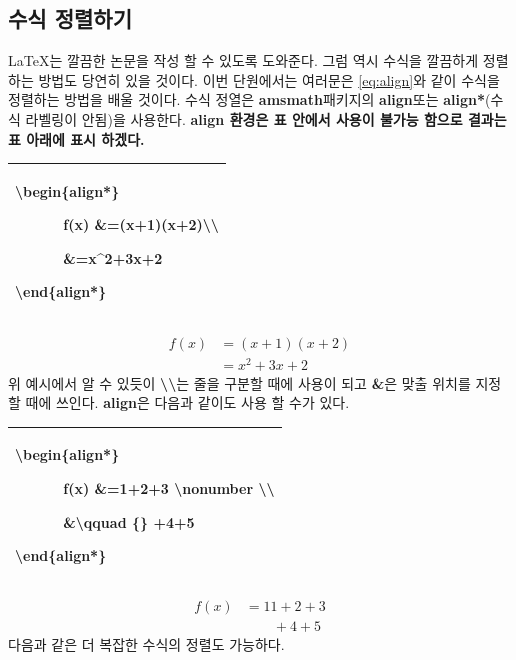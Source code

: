 \documentclass[12pt]{article}
\begin{document}
	\subsection{수식 정렬하기}
	\LaTeX 는 깔끔한 논문을 작성 할 수 있도록 도와준다. 그럼 역시 수식을 깔끔하게 정렬하는 방법도 당연히 있을 것이다. 이번 단원에서는 여러문은 \eqref{eq:align}와 같이 수식을 정렬하는 방법을 배울 것이다.\newline
	수식 정열은 \textbf{amsmath}패키지의 \textbf{align}또는 \textbf{align*}(수식 라벨링이 안됨)을 사용한다.\newline
	\textbf{align 환경은 표 안에서 사용이 불가능 함으로 결과는 표 아래에 표시 하겠다.}\newline
	
	\begin{tabularx}{\textwidth\onehalfspacing}{|X|}
		\hline
		\textbackslash begin\{align*\}
		
		\ \ \ \ \ \ f(x) \&=(x+1)(x+2)\textbackslash\textbackslash
		
		\ \ \ \ \ \ \&=x\textasciicircum2+3x+2
		
		\textbackslash end\{align*\}
		\\\hline
	\end{tabularx}
	\begin{align*}
	f(x) &=(x+1)(x+2)\\
	&=x^2+3x+2
	\end{align*}
	위 예시에서 알 수 있듯이 \textbf{\textbackslash\textbackslash}는 줄을 구분할 때에 사용이 되고 \textbf{\&}은 맞출 위치를 지정 할 때에 쓰인다.
	\newline\newline
	\textbf{align}은 다음과 같이도 사용 할 수가 있다.\newline
	
	\begin{tabularx}{\textwidth\onehalfspacing}{|X|}
		\hline
		\textbackslash begin\{align*\}
		
		\ \ \ \ \ \ f(x) \&=1+2+3 \textbackslash nonumber \textbackslash\textbackslash
		
		\ \ \ \ \ \ \&\textbackslash qquad \{\} +4+5
		
		\textbackslash end\{align*\}\\
		\hline
	\end{tabularx}
	\begin{align*}
		f(x) &=11+2+3\nonumber\\
		& \qquad{}+4+5
	\end{align*}\clearpage
	다음과 같은 더 복잡한 수식의 정렬도 가능하다.\newline
	
\end{document}
